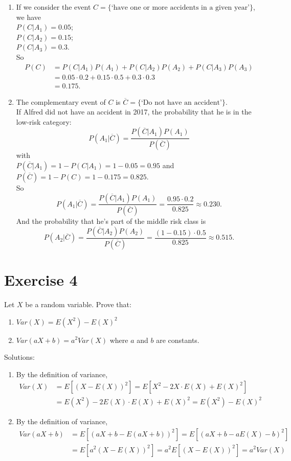 \documentclass[12pt,thmsa]{article}\usepackage[]{graphicx}\usepackage[]{color}
\begin{document}
\begin{enumerate}
	\item If we consider the event $C=\{\mbox{`have one or more accidents in a given year'}\}$, we have\\
	$P(C|A_{1})=0.05$;\\
	$P(C|A_{2})=0.15$;\\
	$P(C|A_{3})=0.3$.\\
	So
	\begin{align*}
	P(C) &=P(C|A_{1})P(A_{1})+ P(C|A_{2})P(A_{2})+P(C|A_{3})P(A_{3})\\
	&= 0.05\cdot 0.2 + 0.15\cdot 0.5 + 0.3 \cdot 0.3\\
	&=0.175.
	\end{align*}
	\item The complementary event of $C$ is $\overline{C}=\{\mbox{`Do not have an accident'}\}$. \\
	If Alfred did not have an accident in 2017, the probability that he is in the low-risk category:\\
	$$P(A_{1}|\overline{C})=\frac{P(\overline{C}|A_{1})P(A_{1})}{P(\overline{C})}$$
	with\\
	$P(\overline{C}|A_{1})=1-P(C|A_{1})=1-0.05=0.95$ and\\
	$P(\overline{C})=1-P(C)=1-0.175= 0.825$.\\
	So\\
	$$P(A_{1}|\overline{C})= \frac{P(\overline{C}|A_{1}) P(A_{1})}{P(\overline{C})}=\frac{0.95\cdot0.2}{0.825}\approx0.230.$$
	 And the probability that he's part of the middle risk class is
	 $$P(A_{2}|\overline{C})=\frac{P(\overline{C}|A_{2})P(A_{2})}{P(\overline{C})}= \frac{(1-0.15)\cdot0.5}{0.825}\approx0.515.$$

\end{enumerate}



\section*{Exercise 4}

Let $X$ be a random variable. Prove that:
\begin{enumerate}
  \item $Var(X)=E(X^2)-E(X)^2$
  \item $Var(aX+b)=a^2 Var(X)$ where $a$ and $b$ are constants.
\end{enumerate}

\noindent Solutions:
\begin{enumerate}
\item By the definition of variance,
  \begin{align*}
    Var(X)&=E[(X-E(X))^2]=E[X^2-2X\cdot E(X)+E(X)^2]\\
    &=E(X^2)-2E(X)\cdot E(X)+E(X)^2=E(X^2)-E(X)^2
  \end{align*}
 \item By the definition of variance,
  \begin{align*}
    Var(aX+b)&=E[(aX+b-E(aX+b))^2]=E[(aX+b-aE(X)-b)^2]\\
&=E[a^2(X-E(X))^2]=a^2	E[(X-E(X))^2]=a^2Var(X)
   \end{align*}
\end{enumerate}
\end{document}
